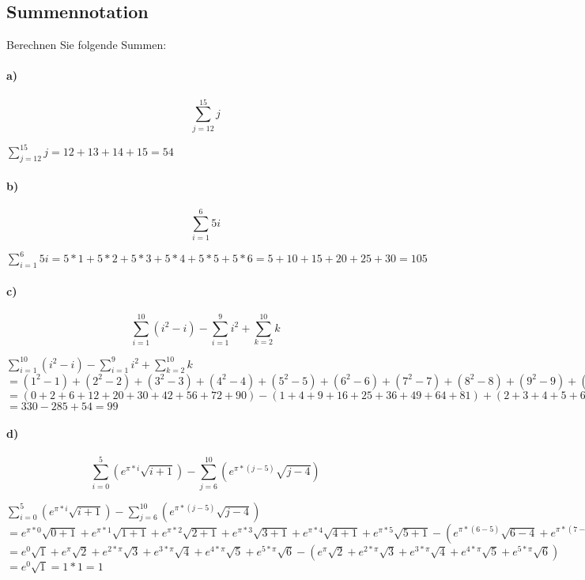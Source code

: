 \documentclass[paper=a4, fontsize=11pt]{scrartcl}
\numberwithin{equation}{section}
\numberwithin{figure}{section}
\numberwithin{table}{section}
\begin{document}
\subsection{Summennotation}
Berechnen Sie folgende Summen:
\paragraph{a)}
$$\sum^{15}_{j=12}j$$

$\sum^{15}_{j=12}j = 12+13+14+15 = 54$

\paragraph{b)}
$$\sum^{6}_{i=1}5i$$

$\sum^{6}_{i=1}5i = 5*1+5*2+5*3+5*4+5*5+5*6 = 5+10+15+20+25+30 = 105$

\paragraph{c)}
$$\sum^{10}_{i=1}(i^{2}-i)-\sum^{9}_{i=1}i^{2}+\sum^{10}_{k=2}k$$

$\sum^{10}_{i=1}(i^{2}-i)-\sum^{9}_{i=1}i^{2}+\sum^{10}_{k=2}k $ \\
$= (1^{2}-1)+(2^{2}-2)+(3^{2}-3)+(4^{2}-4)+(5^{2}-5)
+(6^{2}-6)+(7^{2}-7)+(8^{2}-8)+(9^{2}-9)
+(10^{2}-10)
-(1^{2}+2^{2}+3^{2}+4^{2}+5^{2}+6^{2}
+7^{2}+8^{2}+9^{2})
+(2+3+4+5+6+7+8+9+10)$ \\
$=
(0+2+6+12+20+30+42+56+72+90)
-(1+4+9+16+25+36+49+64+81)
+(2+3+4+5+6+7+8+9+10)$ \\
$=
330-285+54 = 99$

\paragraph{d)}
$$\sum^{5}_{i=0}(e^{\pi *i} \sqrt{i+1})-\sum^{10}_{j=6}(e^{\pi *(j-5)} \sqrt{j-4})$$

$\sum^{5}_{i=0}(e^{\pi *i} \sqrt{i+1})-\sum^{10}_{j=6}(e^{\pi *(j-5)} \sqrt{j-4})$ \\
$=
e^{\pi *0} \sqrt{0+1} + e^{\pi *1} \sqrt{1+1}
+ e^{\pi *2} \sqrt{2+1} + e^{\pi *3} \sqrt{3+1}
+ e^{\pi *4} \sqrt{4+1} + e^{\pi *5} \sqrt{5+1} 
- (e^{\pi *(6-5)} \sqrt{6-4} + e^{\pi *(7-5)} \sqrt{7-4} + e^{\pi *(8-5)} \sqrt{8-4} 
+ e^{\pi *(9-5)} \sqrt{9-4} + e^{\pi *(10-5)} \sqrt{10-4})$ \\
$=
e^{0} \sqrt{1} + e^{\pi} \sqrt{2} +  e^{2* \pi} \sqrt{3} +  e^{3* \pi} \sqrt{4} +  e^{4* \pi} \sqrt{5}
+  e^{5* \pi} \sqrt{6}
-( e^{\pi} \sqrt{2} +  e^{2* \pi} \sqrt{3}
+  e^{3* \pi} \sqrt{4} +  e^{4* \pi} \sqrt{5}
+  e^{5* \pi} \sqrt{6})  $ \\
$=
e^{0} \sqrt{1} = 1*1 = 1 $
\end{document}
